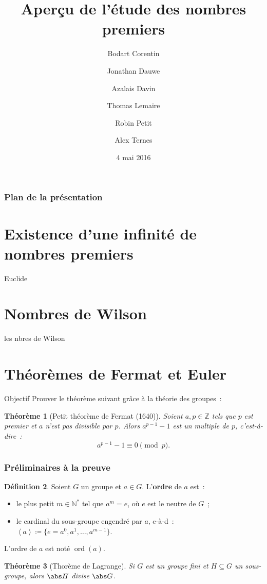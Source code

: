 \documentclass[10pt, mathserif]{beamer}
\title{Aperçu de l'étude des nombres premiers}
\author{Bodart Corentin %
	\and Jonathan Dauwe %
	\and Azalais Davin %
	\and Thomas Lemaire %
	\and Robin Petit %
	\and Alex Ternes}
\date{4 mai 2016}
\institute{Université Libre de Bruxelles}
\DeclareMathOperator{\ord}{ord}
\newcommand{\Z}{\mathbb Z}
\newcommand{\N}{\mathbb N}
\newcommand{\eng}[1]{\left\langle#1\right\rangle}
\newtheorem{thm}{Théorème}[section]
\theoremstyle{definition}
\newtheorem{déf}[thm]{Définition}
\theoremstyle{remark}
\begin{document}
	\frame{\titlepage}

	\begin{frame}
		\frametitle{Plan de la présentation}
		\tableofcontents
	\end{frame}

\section{Existence d'une infinité de nombres premiers}
	\begin{frame}
		Euclide
	\end{frame}

\section{Nombres de Wilson}  %
	\begin{frame}
		les nbres de Wilson
	\end{frame}
	
	
\section{Théorèmes de Fermat et Euler}
	\begin{frame}
		\begin{block}{Objectif}
			Prouver le théorème suivant grâce à la théorie des groupes~:
		\end{block}

		\begin{thm}[Petit théorème de Fermat (1640)]
			Soient $a, p \in\Z$ tels que $p$ est premier et $a$ n'est pas divisible par $p$. Alors $a^{p-1} - 1$ est un multiple de $p$, c'est-à-dire~:
			\[a^{p-1}-1 \equiv 0 \pmod p.\]
		\end{thm}
	\end{frame}

	\begin{frame}
		\frametitle{Préliminaires à la preuve}
		\begin{déf}
			Soient $G$ un groupe et $a \in G$. L'\textbf{ordre} de $a$ est~:
			\begin{itemize}
				\item le plus petit $m \in \N^*$ tel que $a^m = e$, où $e$ est le neutre de $G$~;
				\item le cardinal du sous-groupe engendré par $a$, c-à-d~: $\eng a \coloneqq \{e = a^0, a^1, \dotsc, a^{m-1}\}$.
			\end{itemize}

			L'ordre de $a$ est noté $\ord(a)$.
		\end{déf}

		\begin{thm}[Thorème de Lagrange]
			Si $G$ est un groupe fini et $H \subseteq G$ un sous-groupe, alors $\abs H$ divise $\abs G$.
		\end{thm}
	\end{frame}
\end{document}
